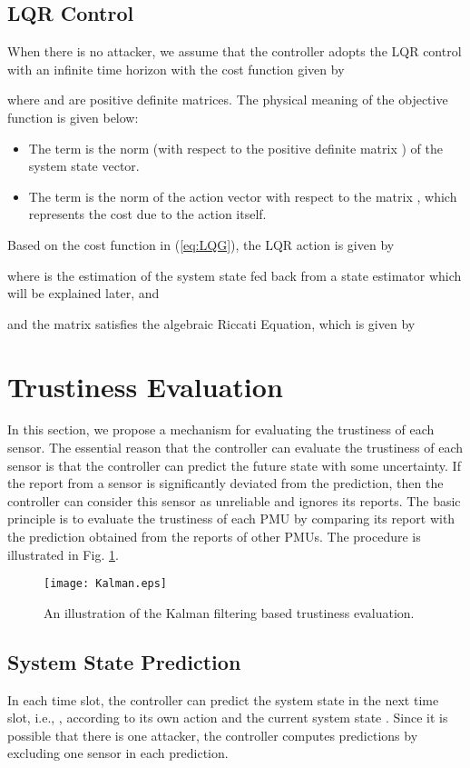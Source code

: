 \documentclass[journal,10pt,twocolumn]{IEEEtran}
\begin{document}
\subsection{LQR Control}
When there is no attacker, we assume that the controller adopts the LQR control \cite{Kwakernaak1972} with an infinite time horizon with the cost function given by

where  and  are positive definite matrices. The physical meaning of the objective function is given below:
\begin{itemize}
\item The term  is the norm (with respect to the positive definite matrix ) of the system state vector.

\item The term  is the norm of the action vector with respect to the matrix , which represents the cost due to the action itself.
\end{itemize}

Based on the cost function in (\ref{eq:LQG}), the LQR action  is given by

where  is the estimation of the system state fed back from a state estimator which will be explained later, and

and the matrix  satisfies the algebraic Riccati Equation, which is given by


\section{Trustiness Evaluation}\label{sec:evaluation}
In this section, we propose a mechanism for evaluating the trustiness of each sensor. The essential reason that the controller can evaluate the trustiness of each sensor is that the controller can predict the future state with some uncertainty. If the report from a sensor is significantly deviated from the prediction, then the controller can consider this sensor as unreliable and ignores its reports. The basic principle is to evaluate the trustiness of each PMU by comparing its report with the prediction obtained from the reports of other  PMUs. The procedure is illustrated in Fig. \ref{fig:Kalman}.
\begin{figure}
  \centering
  \texttt{[image: Kalman.eps]}
  \caption{An illustration of the Kalman filtering based trustiness evaluation.}\label{fig:Kalman}
\end{figure}

\subsection{System State Prediction}
In each time slot, the controller can predict the system state in the next time slot, i.e., , according to its own action  and the current system state . Since it is possible that there is one attacker, the controller computes  predictions by excluding one sensor in each prediction.
\end{document}
